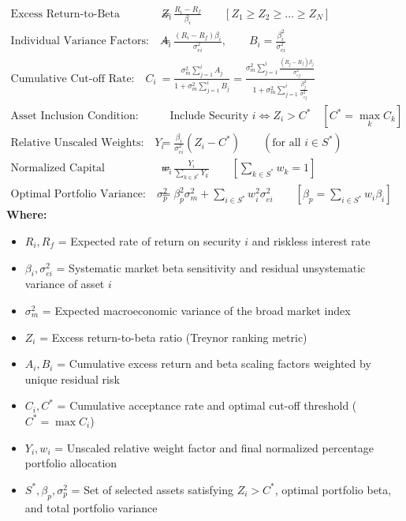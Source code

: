\newpage
\begin{formulabox}
\begin{align*}
    \text{Excess Return-to-Beta Ratio:} \quad Z_i &= \frac{R_i - R_f}{\beta_i} \qquad [Z_1 \ge Z_2 \ge \dots \ge Z_N] \\[4pt]
    \text{Individual Variance Factors:} \quad A_i &= \frac{(R_i - R_f)\beta_i}{\sigma_{ei}^2}, \qquad B_i = \frac{\beta_i^2}{\sigma_{ei}^2} \\[4pt]
    \text{Cumulative Cut-off Rate:} \quad C_i &= \frac{\sigma_m^2 \sum_{j=1}^i A_j}{1 + \sigma_m^2 \sum_{j=1}^i B_j} = \frac{\sigma_m^2 \sum_{j=1}^i \frac{(R_j - R_f)\beta_j}{\sigma_{ej}^2}}{1 + \sigma_m^2 \sum_{j=1}^i \frac{\beta_j^2}{\sigma_{ej}^2}} \\[4pt]
    \text{Asset Inclusion Condition:} &\quad \text{Include Security } i \iff Z_i > C^* \quad \left[C^* = \max_{k} C_k\right] \\[4pt]
    \text{Relative Unscaled Weights:} \quad Y_i &= \frac{\beta_i}{\sigma_{ei}^2}(Z_i - C^*) \qquad (\text{for all } i \in S^*) \\[4pt]
    \text{Normalized Capital Allocation:} \quad w_i &= \frac{Y_i}{\sum_{k \in S^*} Y_k} \qquad \left[\sum_{k \in S^*} w_k = 1\right] \\[4pt]
    \text{Optimal Portfolio Variance:} \quad \sigma_p^2 &= \beta_p^2 \sigma_m^2 + \sum_{i \in S^*} w_i^2 \sigma_{ei}^2 \qquad \left[\beta_p = \sum_{i \in S^*} w_i \beta_i\right]
\end{align*}
\textbf{Where:}
\begin{itemize}[noitemsep, topsep=2pt]
    \item $R_i, R_f$ = Expected rate of return on security $i$ and riskless interest rate
    \item $\beta_i, \sigma_{ei}^2$ = Systematic market beta sensitivity and residual unsystematic variance of asset $i$
    \item $\sigma_m^2$ = Expected macroeconomic variance of the broad market index
    \item $Z_i$ = Excess return-to-beta ratio (Treynor ranking metric)
    \item $A_i, B_i$ = Cumulative excess return and beta scaling factors weighted by unique residual risk
    \item $C_i, C^*$ = Cumulative acceptance rate and optimal cut-off threshold ($C^* = \max C_i$)
    \item $Y_i, w_i$ = Unscaled relative weight factor and final normalized percentage portfolio allocation
    \item $S^*, \beta_p, \sigma_p^2$ = Set of selected assets satisfying $Z_i > C^*$, optimal portfolio beta, and total portfolio variance
\end{itemize}
\end{formulabox}
